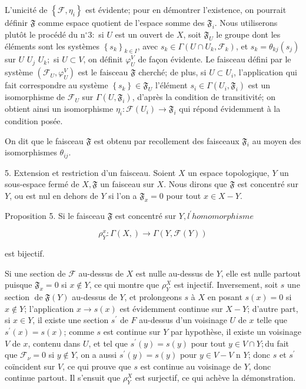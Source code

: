 L'unicité de $\left\{\mathcal{F}, \eta_{i}\right\}$ est évidente; pour en démontrer l'existence, on pourrait définir $\mathfrak{F}$ comme espace quotient de l'espace somme des $\mathfrak{F}_{i}$. Nous utiliserons plutôt le procédé du $\mathrm{n}^{\circ} 3:$ si $U$ est un ouvert de $X$, soit $\mathfrak{F}_{U}$ le groupe dont les éléments sont les systèmes $\left\{s_{k}\right\}_{k \in I}$, avec $s_{k} \in \Gamma\left(U \cap U_{k}, \mathcal{F}_{k}\right)$, et $s_{k}=\theta_{k j}\left(s_{j}\right)$ sur $U$ \cap $U_{j}$ \cap $U_{k} ;$ si $U \subset V$, on définit $\varphi_{U}^{V}$ de façon évidente. Le faisceau défini par le système $\left(\mathcal{F}_{U}, \varphi_{U}^{V}\right)$ est le faisceau $\mathfrak{F}$ cherché; de plus, si $U \subset U_{i}$, l'application qui fait correspondre au système $\left\{s_{k}\right\} \in \mathfrak{F}_{U}$ l'élément $s_{i} \in \Gamma\left(U_{i}, \mathfrak{F}_{i}\right)$ est un isomorphisme de $\mathcal{F}_{U}$ sur $\Gamma\left(U, \mathfrak{F}_{i}\right)$, d'après la condition de transitivité; on obtient ainsi un isomorphisme $\eta_{i}: \mathscr{F}\left(U_{i}\right) \rightarrow \mathfrak{F}_{i}$ qui répond évidemment à la condition posée.

On dit que le faisceau $\mathfrak{F}$ est obtenu par recollement des faisceaux $\mathfrak{F}_{i}$ au moyen des isomorphismes $\theta_{i j}$.

5. Extension et restriction d'un faisceau. Soient $X$ un espace topologique, $Y$ un sous-espace fermé de $X, \mathfrak{F}$ un faisceau sur $X .$ Nous dirons que $\mathfrak{F}$ est concentré sur $Y$, ou est nul en dehors de $Y$ si l'on a $\mathfrak{F}_{x}=0$ pour tout $x \in X-Y$.

Proposition 5. Si le faisceau $\mathfrak{F}$ est concentré sur $Y, l^{\prime} h o m o m o r p h i s m e$

$$
\rho_{Y}^{x}: \Gamma(X, \mathscr{}) \rightarrow \Gamma(Y, \mathscr{F}(Y))
$$

est bijectif.

Si une section de $\mathscr{F}$ au-dessus de $X$ est nulle au-dessus de $Y$, elle est nulle partout puisque $\mathfrak{F}_{x}=0$ si $x \notin Y$, ce qui montre que $\rho_{Y}^{X}$ est injectif. Inversement, soit $s$ une section $\operatorname{de} \mathfrak{F}(Y)$ au-dessus de $Y$, et prolongeons $s$ à $X$ en posant $s(x)=0$ si $x \notin Y$; l'application $x \rightarrow s(x)$ est évidemment continue sur $X-Y$; d'autre part, si $x \in Y$, il existe une section $s^{\prime}$ de $F$ au-dessus d'un voisinage $U$ de $x$ telle que $s^{\prime}(x)=s(x)$; comme $s$ est continue sur $Y$ par hypothèse, il existe un voisinage $V$ de $x$, contenu dans $U$, et tel que $s^{\prime}(y)=s(y)$ pour tout $y \in V \cap Y ; \mathrm{du}$ fait que $\mathcal{F}_{\nu}=0$ si $y \notin Y$, on a aussi $s^{\prime}(y)=s(y)$ pour $y \in V-V$ n $Y$; donc $s$ et $s^{\prime}$ coïncident sur $V$, ce qui prouve que $s$ est continue au voisinage de $Y$, donc continue partout. Il s'ensuit que $\rho_{Y}^{X}$ est surjectif, ce qui achève la démonstration.

